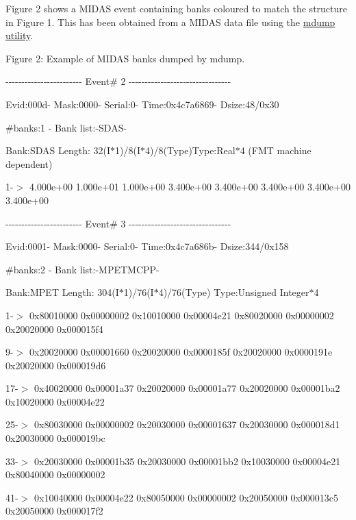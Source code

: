 Figure 2 shows a MIDAS event containing banks coloured to match the structure in Figure 1. This has been obtained from a MIDAS data file using the \hyperlink{RC_Monitor_RC_mdump_utility}{mdump utility}.

\par
\par
  Figure 2: Example of MIDAS banks dumped by mdump. \par
 -\/-\/-\/-\/-\/-\/-\/-\/-\/-\/-\/-\/-\/-\/-\/-\/-\/-\/-\/-\/-\/-\/-\/-\/ Event\# 2 -\/-\/-\/-\/-\/-\/-\/-\/-\/-\/-\/-\/-\/-\/-\/-\/-\/-\/-\/-\/-\/-\/-\/-\/-\/-\/-\/-\/-\/-\/-\/-\/\par
 Evid:000d-\/ Mask:0000-\/ Serial:0-\/ Time:0x4c7a6869-\/ Dsize:48/0x30\par
 \#banks:1 -\/ Bank list:-\/SDAS-\/\par
 \par
 Bank:SDAS Length: 32(I$\ast$1)/8(I$\ast$4)/8(Type)Type:Real$\ast$4 (FMT machine dependent)\par
  1-\/$>$ 4.000e+00 1.000e+01 1.000e+00 3.400e+00 3.400e+00 3.400e+00 3.400e+00 3.400e+00\par
 \par
 -\/-\/-\/-\/-\/-\/-\/-\/-\/-\/-\/-\/-\/-\/-\/-\/-\/-\/-\/-\/-\/-\/-\/-\/ Event\# 3 -\/-\/-\/-\/-\/-\/-\/-\/-\/-\/-\/-\/-\/-\/-\/-\/-\/-\/-\/-\/-\/-\/-\/-\/-\/-\/-\/-\/-\/-\/-\/-\/\par
 Evid:0001-\/ Mask:0000-\/ Serial:0-\/ Time:0x4c7a686b-\/ Dsize:344/0x158\par
 \#banks:2 -\/ Bank list:-\/MPETMCPP-\/\par
 \par
 Bank:MPET Length: 304(I$\ast$1)/76(I$\ast$4)/76(Type) Type:Unsigned Integer$\ast$4\par
  1-\/$>$ 0x80010000 0x00000002 0x10010000 0x00004e21 0x80020000 0x00000002 0x20020000 0x000015f4\par
 9-\/$>$ 0x20020000 0x00001660 0x20020000 0x0000185f 0x20020000 0x0000191e 0x20020000 0x000019d6\par
 17-\/$>$ 0x40020000 0x00001a37 0x20020000 0x00001a77 0x20020000 0x00001ba2 0x10020000 0x00004e22\par
 25-\/$>$ 0x80030000 0x00000002 0x20030000 0x00001637 0x20030000 0x000018d1 0x20030000 0x000019bc\par
 33-\/$>$ 0x20030000 0x00001b35 0x20030000 0x00001bb2 0x10030000 0x00004e21 0x80040000 0x00000002\par
 41-\/$>$ 0x10040000 0x00004e22 0x80050000 0x00000002 0x20050000 0x000013c5 0x20050000 0x000017f2\par
